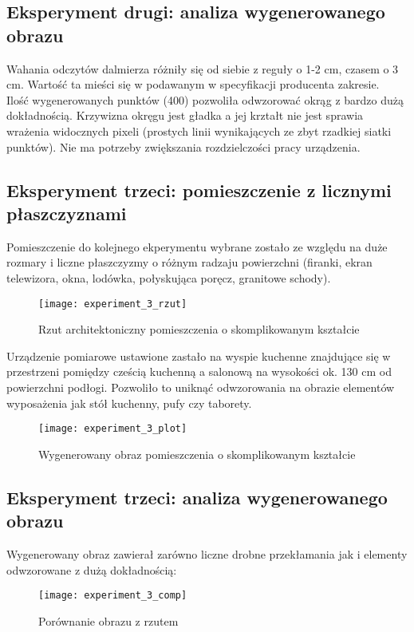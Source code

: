 \subsection {Eksperyment drugi: analiza wygenerowanego obrazu}
Wahania odczytów dalmierza różniły się od siebie z reguły o 1-2 cm, czasem o 3 cm. Wartość ta mieści się w podawanym w specyfikacji producenta zakresie.\\

Ilość wygenerowanych punktów (400) pozwoliła odwzorować okrąg z bardzo dużą dokładnością. Krzywizna okręgu jest gładka a jej krztałt nie jest sprawia wrażenia widocznych pixeli (prostych linii wynikających ze zbyt rzadkiej siatki punktów). Nie ma potrzeby zwiększania rozdzielczości pracy urządzenia.\\

\newpage
\subsection {Eksperyment trzeci: pomieszczenie z licznymi płaszczyznami}
Pomieszczenie do kolejnego ekperymentu wybrane zostało ze względu na duże rozmary i liczne płaszczyzmy o różnym radzaju powierzchni (firanki, ekran telewizora, okna, lodówka, połyskująca poręcz, granitowe schody).\\
\begin{figure}[h]
    \centering
    \texttt{[image: experiment\_3\_rzut]}
    \caption{Rzut architektoniczny pomieszczenia o skomplikowanym kształcie}
    \label{fig:experiment_3_rzut}
\end{figure}

Urządzenie pomiarowe ustawione zastało na wyspie kuchenne znajdujące się w przestrzeni pomiędzy cześcią kuchenną a salonową na wysokości ok. 130 cm od powierzchni podłogi. Pozwoliło to uniknąć odwzorowania na obrazie elementów wyposażenia jak stół kuchenny, pufy czy taborety.\\
\begin{figure}[h]
    \centering
    \texttt{[image: experiment\_3\_plot]}
    \caption{Wygenerowany obraz pomieszczenia o skomplikowanym kształcie}
    \label{fig:experiment_3_plot}
\end{figure}

\newpage
\subsection {Eksperyment trzeci: analiza wygenerowanego obrazu}
Wygenerowany obraz zawierał zarówno liczne drobne przekłamania jak i elementy odwzorowane z dużą dokładnością:\\
\begin{figure}[h]
    \centering
    \texttt{[image: experiment\_3\_comp]}
    \caption{Porównanie obrazu z rzutem}
    \label{fig:experiment_3_comp}
\end{figure}

